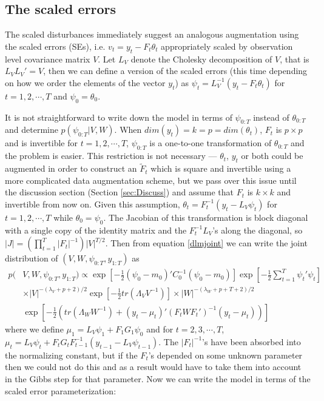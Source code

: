 \documentclass{article}
\begin{document}
\subsection{The scaled errors}\label{sec:scalederrors}
The scaled disturbances immediately suggest an analogous augmentation using the scaled errors (SEs), i.e. $v_t=y_t - F_t\theta_t$ appropriately scaled by observation level covariance matrix $V$. Let $L_V$ denote the Cholesky decomposition of $V$, that is $L_VL_V'=V$, then we can define a version of the scaled errors (this time depending on how we order the elements of the vector $y_t$) as $\psi_t = L_V^{-1}(y_t - F_t\theta_t)$ for $t=1,2,\cdots,T$ and $\psi_0 = \theta_0$. 

It is not straightforward to write down the model in terms of $\psi_{0:T}$ instead of $\theta_{0:T}$ and determine $p(\psi_{0:T}|V,W)$. When $dim(y_t)=k=p=dim(\theta_t)$, $F_t$ is $p\times p$ and is invertible for $t=1,2,\cdots,T$, $\psi_{0:T}$ is a one-to-one transformation of $\theta_{0:T}$ and the problem is easier. This restriction is not necessary --- $\theta_t$, $y_t$ or both could be augmented in order to construct an $\tilde{F}_t$ which is square and invertible using a more complicated data augmentation scheme, but we pass over this issue until the discussion section (Section \ref{sec:Discuss}) and assume that $F_t$ is $k\times k$ and invertible from now on. Given this assumption, $\theta_t = F_t^{-1}(y_t - L_V\psi_t)$ for $t=1,2,\cdots,T$ while $\theta_0=\psi_0$. The Jacobian of this transformation is block diagonal with a single copy of the identity matrix and the $F_t^{-1}L_V$'s along the diagonal, so $|J|=(\prod_{t=1}^T|F_t|^{-1})|V|^{T/2}$. Then from equation \eqref{dlmjoint} we can write the joint distribution of $(V, W, \psi_{0:T}, y_{1:T})$ as
\begin{align}
    p(&V,W,\psi_{0:T},y_{1:T}) \propto \exp\left[-\frac{1}{2}(\psi_0-m_0)'C_0^{-1}(\psi_0-m_0)\right] \exp\left[-\frac{1}{2}\sum_{t=1}^T\psi_t'\psi_t\right] \nonumber\\
  &\times |V|^{-(\lambda_V + p + 2)/2}\exp\left[-\frac{1}{2}tr\left(\Lambda_VV^{-1}\right)\right]  \times |W|^{-(\lambda_W + p + T + 2)/2} \nonumber\\
   & \exp\left[-\frac{1}{2}\left(tr\left(\Lambda_WW^{-1}\right) + (y_t - \mu_t)'(F_tWF_t')^{-1}(y_t-\mu_t)\right)\right]\label{dlmerrorjoint}
\end{align}
where we define $\mu_1 = L_V\psi_1 + F_1G_1\psi_0$ and for $t=2,3,\cdots,T$, $\mu_t =L_V\psi_t + F_tG_tF_{t-1}^{-1}(y_{t-1} - L_{V}\psi_{t-1})$. The $|F_t|^{-1}$'s have been absorbed into the normalizing constant, but if the $F_t$'s depended on some unknown parameter then we could not do this and as a result would have to take them into account in the Gibbs step for that parameter. Now we can write the model in terms of the scaled error parameterization:
\end{document}
